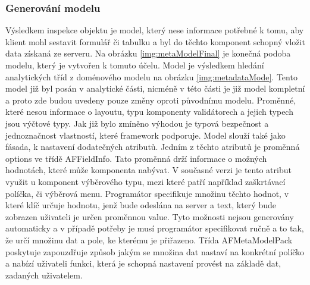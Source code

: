\subsubsection{Generování modelu}
Výsledkem inspekce objektu je model, který nese informace potřebné k tomu, aby klient mohl sestavit formulář či tabulku a byl do těchto komponent schopný vložit data získaná ze serveru. Na obrázku \ref{img:metaModelFinal} je konečná podoba modelu, který je vytvořen k tomuto účelu. Model je výsledkem hledání analytických tříd z doménového modelu na obrázku \ref{img:metadataMode}. Tento model již byl posán v analytické části, nicméně v této části je již model kompletní a proto zde budou uvedeny pouze změny oproti původnímu modelu. Proměnné, které nesou informace o layoutu, typu komponenty validátorech a jejich typech jsou výčtové typy. Jak již bylo zmíněno výhodou je typová bezpečnost a jednoznačnost vlastností, které framework podporuje. Model slouží také jako fásada, k nastavení dodatečných atributů. Jedním z těchto atributů je proměnná options ve třídě AFFieldInfo. Tato proměnná drží informace o možných hodnotách, které může komponenta nabývat. V současné verzi je tento atribut využit u komponent výběrového typu, mezi které patří například zaškrtávací políčka, či výběrová menu. Programátor specifikuje množinu těchto hodnot, v které klíč určuje hodnotu, jenž bude odeslána na server a text, který bude zobrazen uživateli je určen proměnnou value. Tyto možnosti nejsou generovány automaticky a v případě potřeby je musí programátor specifikovat ručně a to tak, že určí množinu dat a pole, ke kterému je přiřazeno. Třída AFMetaModelPack poskytuje zapouzdřuje způsob jakým se množina dat nastaví na konkrétní políčko a nabízí uživateli funkci, která je schopná nastavení provést na základě dat, zadaných uživatelem.

